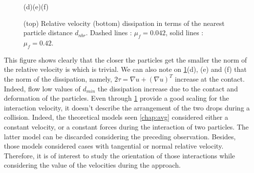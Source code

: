 \begin{figure}[h!]
        \hspace{3cm}(d)\hfill(e)\hfill(f)\hspace{2.5cm}
        
        \caption{(top) Relative velocity (bottom) dissipation in terms of the nearest particle distance $d_{nbr}$. Dashed lines : $\mu_f = 0.042$, solid lines : $\mu_f = 0.42$.} 
        \label{fig:Pvrel}
    \end{figure} 
This figure shows clearly that the closer the particles get the smaller the norm of the relative velocity is which is trivial.
We can also note on \ref{fig:Pvrel}(d), (e) and (f) that the norm of the dissipation, namely, $2\tau = \nabla u + (\nabla u)^T$ increase at the contact. 
Indeed, flow low values of $d_{min}$ the dissipation increase due to the contact and deformation of the particles.   
Even through \ref{fig:Pvrel} provide a good scaling for the interaction velocity, it doesn't describe the arrangement of the two drops during a collision. 
Indeed, the theoretical models seen \ref{chap:avg} considered either a constant velocity, or a constant forces during the interaction of two particles.
The latter model can be discarded considering the preceding observation.
Besides, those models considered cases with tangential or  normal relative velocity. 
Therefore, it is of interest to study the orientation of those interactions while considering the value of the velocities during the approach.

